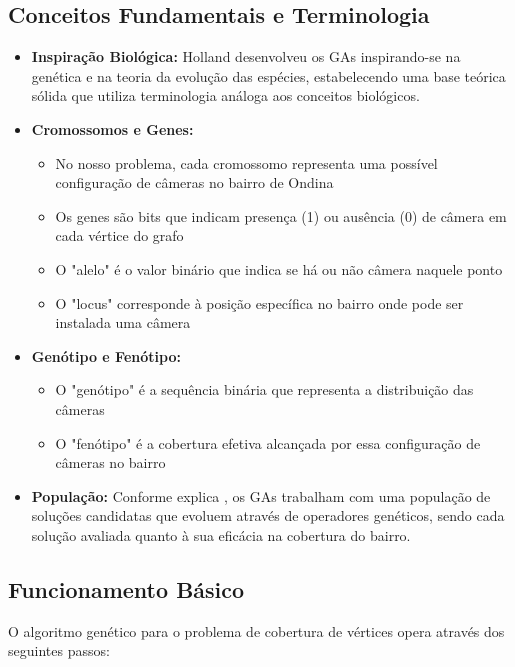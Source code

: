 \documentclass[12pt, a4paper]{report}
\begin{document}
\subsection{Conceitos Fundamentais e Terminologia}
\begin{itemize}
    \item \textbf{Inspiração Biológica:} Holland \cite{Holland1975} desenvolveu os GAs inspirando-se na genética e na teoria da evolução das espécies, estabelecendo uma base teórica sólida que utiliza terminologia análoga aos conceitos biológicos.
    
    \item \textbf{Cromossomos e Genes:} 
    \begin{itemize}
        \item No nosso problema, cada cromossomo representa uma possível configuração de câmeras no bairro de Ondina
        \item Os genes são bits que indicam presença (1) ou ausência (0) de câmera em cada vértice do grafo
        \item O "alelo" é o valor binário que indica se há ou não câmera naquele ponto
        \item O "locus" corresponde à posição específica no bairro onde pode ser instalada uma câmera
    \end{itemize}
    
    \item \textbf{Genótipo e Fenótipo:}
    \begin{itemize}
        \item O "genótipo" é a sequência binária que representa a distribuição das câmeras
        \item O "fenótipo" é a cobertura efetiva alcançada por essa configuração de câmeras no bairro
    \end{itemize}
    
    \item \textbf{População:} Conforme explica \cite{Linden2006}, os GAs trabalham com uma população de soluções candidatas que evoluem através de operadores genéticos, sendo cada solução avaliada quanto à sua eficácia na cobertura do bairro.
\end{itemize}

\subsection{Funcionamento Básico}
O algoritmo genético para o problema de cobertura de vértices opera através dos seguintes passos:
\end{document}
